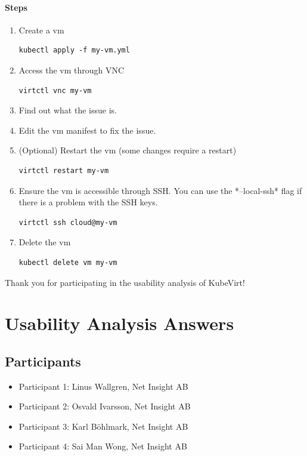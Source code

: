 \documentclass{kththesis}
\begin{document}
\begin{enumerate}
\subsubsection*{Steps}
\begin{enumerate}
    \item Create a \Gls{vm}
\begin{lstlisting}
kubectl apply -f my-vm.yml
\end{lstlisting}
    \item Access the \Gls{vm} through VNC
\begin{lstlisting}
virtctl vnc my-vm
\end{lstlisting}
    \item Find out what the issue is.
    \item Edit the \Gls{vm} manifest to fix the issue.
    \item (Optional) Restart the \Gls{vm} (some changes require a restart)
\begin{lstlisting}
virtctl restart my-vm
\end{lstlisting}
    \item Ensure the \Gls{vm} is accessible through SSH. You can use the *--local-ssh* flag if there is a problem with the SSH keys.
\begin{lstlisting}
virtctl ssh cloud@my-vm
\end{lstlisting}
    \item Delete the \Gls{vm}
\begin{lstlisting}
kubectl delete vm my-vm
\end{lstlisting}
\end{enumerate}

Thank you for participating in the usability analysis of KubeVirt!

\chapter{Usability Analysis Answers}
\label{appendix:usability-analysis-answers}

\section{Participants}
\begin{itemize}
    \item Participant 1: Linus Wallgren, Net Insight AB
    \item Participant 2: Osvald Ivarsson, Net Insight AB
    \item Participant 3: Karl Böhlmark, Net Insight AB
    \item Participant 4: Sai Man Wong, Net Insight AB
\end{itemize}


\end{enumerate}
\end{document}
